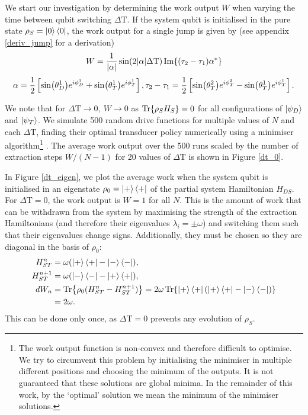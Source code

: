 We start our investigation by determining the work output $W$ when varying the time between qubit switching $\Delta \mathrm{T}$.
If the system qubit is initialised in the pure state $\rho_S = \ket{0} \bra{0}$, the work output for a single jump is given by (see appendix \ref{deriv_jump} for a derivation)
\begin{equation} \label{single_work}
	W = \frac{1}{\abs{\alpha}} \sin(2\abs{\alpha}\Delta \mathrm{T}) \Im{(\tau_2 - \tau_1) \alpha^*}
\end{equation}
\begin{equation*}
	\alpha = \frac{1}{2} \left[\sin(\theta_D^1) e^{i\phi_D^1} + \sin(\theta_T^1) e^{i\phi_T^1}\right], \\
	\tau_2 - \tau_1 = \frac{1}{2} \left[ \sin(\theta_T^2)e^{i\phi_T^2} - \sin(\theta_T^1)e^{i\phi_T^1} \right].
\end{equation*}

We note that for $\Delta \mathrm{T} \to 0, \ W \to 0$ as $\Tr{\rho_S H_S} = 0$ for all configurations of $\ket{\psi_D}$ and $ \ket{\psi_T}$.
We simulate 500 random drive functions for multiple values of $N$ and each $\Delta \mathrm{T}$, finding their optimal transducer policy numerically using a minimiser algorithm\footnote{The work output function is non-convex and therefore difficult to optimise. We try to circumvent this problem by initialising the minimiser in multiple different positions and choosing the minimum of the outputs. It is not guaranteed that these solutions are global minima. In the remainder of this work, by the `optimal' solution we mean the minimum of the minimiser solutions.} \cite{2020SciPy-NMeth}. The average work output over the 500 runs scaled by the number of extraction steps $\overline{W}/(N-1)$ for 20 values of $\Delta \mathrm{T}$ is shown in Figure \ref{dt_0}.

In Figure \ref{dt_eigen}, we plot the average work when the system qubit is initialised in an eigenstate $\rho_0 = \ket{+}\bra{+}$ of the partial system Hamiltonian $H_{DS}$.
For $\Delta \mathrm{T} = 0$, the work output is $W = 1$ for all $N$.
This is the amount of work that can be withdrawn from the system by maximising the strength of the extraction Hamiltonians (and therefore their eigenvalues $\lambda_i = \pm \omega$) and switching them such that their eigenvalues change signs. Additionally, they must be chosen so they are diagonal in the basis of $\rho_0$:
\begin{align*}
	H_{ST}^n &= \omega (\ket{+}\bra{+} - \ket{-}\bra{-}), \\
	H_{ST}^{n+1} &= \omega (\ket{-}\bra{-} - \ket{+}\bra{+}), \\
	dW_n &= \Tr{\rho_0 (H_{ST}^n - H_{ST}^{n+1})} = 2 \omega \Tr{\ket{+}\bra{+} (\ket{+}\bra{+} - \ket{-}\bra{-}) } \\
	&= 2 \omega.
\end{align*}
This can be done only once, as $\Delta \mathrm{T} = 0$ prevents any evolution of $\rho_S$.


